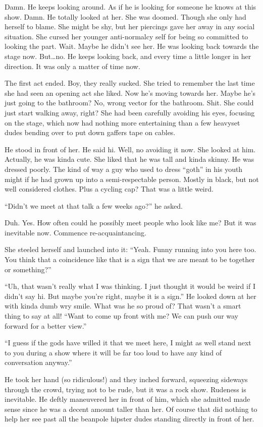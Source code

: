 \documentclass[letterpaper]{article}
\begin{document}
\begin{multicols}{2}
Damn. He keeps looking around. As if he is looking for someone he knows at this show.
Damn. He totally looked at her. She was doomed.
Though she only had herself to blame.
She might be shy, but her piercings gave her away in any social situation.
She cursed her younger anti-normalcy self for being so committed to looking the part.
Wait. Maybe he didn't see her. He was looking back towards the stage now.
But\ldots no. He keeps looking back, and every time a little longer in her direction. It was only a matter of time now.

The first act ended. Boy, they really sucked. She tried to remember the last time she had seen an opening act she liked.
Now he's moving towards her.
Maybe he's just going to the bathroom?
No, wrong vector for the bathroom. Shit.
She could just start walking away, right? She had been carefully avoiding his eyes, focusing on the stage, which now had nothing more entertaining than a few heavyset dudes bending over to put down gaffers tape on cables.

He stood in front of her. He said hi.
Well, no avoiding it now. She looked at him.
Actually, he was kinda cute. She liked that he was tall and kinda skinny. 
He was dressed poorly. 
The kind of way a guy who used to dress ``goth'' in his youth might if he had grown up into a semi-respectable person. Mostly in black, but not well considered clothes. Plus a cycling cap? That was a little weird.

``Didn't we meet at that talk a few weeks ago?'' he asked.

Duh. Yes. How often could he possibly meet people who look like me?
But it was inevitable now.
Commence re-acquaintancing. 

She steeled herself and launched into it: ``Yeah. Funny running into you here too. You think that a coincidence like that is a sign that we are meant to be together or something?''

``Uh, that wasn't really what I was thinking. I just thought it would be weird if I didn't say hi. But maybe you're right, maybe it is a sign.''
He looked down at her with kinda dumb wry smile.
What was he so proud of? That wasn't a smart thing to say at all!
``Want to come up front with me? We can push our way forward for a better view.''

``I guess if the gods have willed it that we meet here, I might as well stand next to you during a show where it will be far too loud to have any kind of conversation anyway.''

He took her hand (so ridiculous!) and they inched forward, squeezing sideways through the crowd, trying not to be rude, but it was a rock show. Rudeness is inevitable.
He deftly maneuvered her in front of him, which she admitted made sense since he was a decent amount taller than her.
Of course that did nothing to help her see past all the beanpole hipster dudes standing directly in front of her.


\end{multicols}
\end{document}
